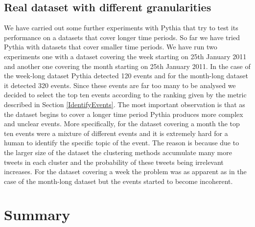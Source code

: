 \subsection{Real dataset with different granularities}
We have carried out some further experiments with Pythia that try to test its performance on a datasets that cover longer time periods. So far we have tried Pythia with datasets that cover smaller time periods. We have run two experiments one with a dataset covering the week starting on 25th January 2011 and another one covering the month starting on 25th January 2011. In the case of the week-long dataset Pythia detected 120 events and for the month-long dataset it detected 320 events. Since these events are far too many to be analysed we decided to select the top ten events according to the ranking given by the metric described in Section \ref{IdentifyEvents}. The most important observation is that as the dataset begins to cover a longer time period Pythia produces more complex and unclear events. More specifically, for the dataset covering a month the top ten events were a mixture of different events and it is extremely hard for a human to identify the specific topic of the event. The reason is because due to the larger size of the dataset the clustering methods accumulate many more tweets in each cluster and the probability of these tweets being irrelevant increases. For the dataset covering a week the problem was as apparent as in the case of the month-long dataset but the events started to become incoherent.      

\section{Summary}




